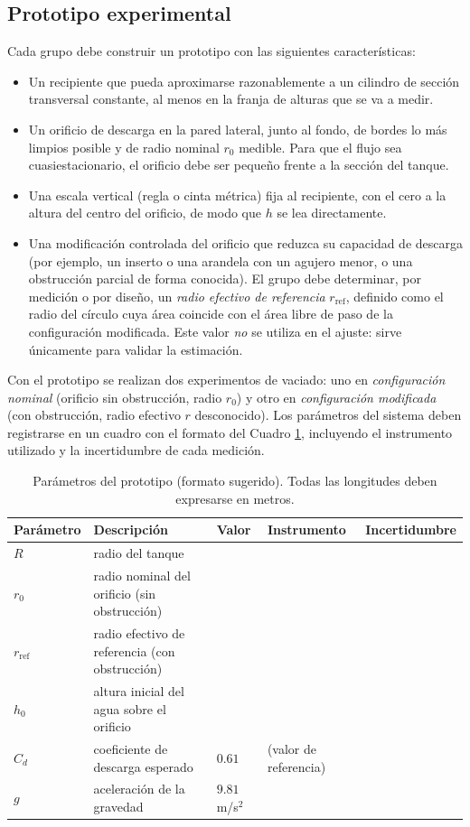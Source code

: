 \documentclass[oneside,letter,spanish,activeacute,english,links,10pt]{amcaGCS_EDO}
\begin{document}
	\subsection{Prototipo experimental}
	Cada grupo debe construir un prototipo con las siguientes características:
	\begin{itemize}
		\item Un recipiente que pueda aproximarse razonablemente a un cilindro de sección transversal constante, al menos en la franja de alturas que se va a medir.
		\item Un orificio de descarga en la pared lateral, junto al fondo, de bordes lo más limpios posible y de radio nominal $r_0$ medible. Para que el flujo sea cuasiestacionario, el orificio debe ser pequeño frente a la sección del tanque.
		\item Una escala vertical (regla o cinta métrica) fija al recipiente, con el cero a la altura del centro del orificio, de modo que $h$ se lea directamente.
		\item Una modificación controlada del orificio que reduzca su capacidad de descarga (por ejemplo, un inserto o una arandela con un agujero menor, o una obstrucción parcial de forma conocida). El grupo debe determinar, por medición o por diseño, un \emph{radio efectivo de referencia} $r_{\mathrm{ref}}$, definido como el radio del círculo cuya área coincide con el área libre de paso de la configuración modificada. Este valor \emph{no} se utiliza en el ajuste: sirve únicamente para validar la estimación.
	\end{itemize}
	
	Con el prototipo se realizan dos experimentos de vaciado: uno en \emph{configuración nominal} (orificio sin obstrucción, radio $r_0$) y otro en \emph{configuración modificada} (con obstrucción, radio efectivo $r$ desconocido). Los parámetros del sistema deben registrarse en un cuadro con el formato del Cuadro \ref{tab:parametros}, incluyendo el instrumento utilizado y la incertidumbre de cada medición.
	\begin{table}[h]
		\centering
		\small
		\begin{tabular}{lp{5.4cm}p{2.0cm}p{2.3cm}p{2.1cm}}
			\hline
			Parámetro & Descripción & Valor & Instrumento & Incertidumbre \\
			\hline
			$R$   & radio del tanque & & & \\
			$r_0$ & radio nominal del orificio (sin obstrucción) & & & \\
			$r_{\mathrm{ref}}$ & radio efectivo de referencia (con obstrucción) & & & \\
			$h_0$ & altura inicial del agua sobre el orificio & & & \\
			$C_d$ & coeficiente de descarga esperado & $0.61$ & (valor de referencia) & \\
			$g$   & aceleración de la gravedad  & $9.81$ m/s$^{2}$ & & \\
			\hline
		\end{tabular}
		\caption{Parámetros del prototipo (formato sugerido). Todas las longitudes deben expresarse en metros.}\label{tab:parametros}
	\end{table}
	
\end{document}
